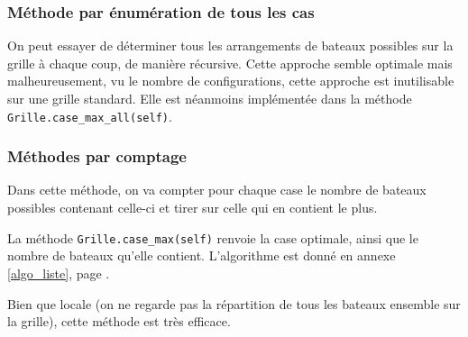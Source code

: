 \subsubsection{Méthode par énumération de tous les cas}

On peut essayer de déterminer tous les arrangements de bateaux possibles sur la grille à chaque coup, de manière récursive. Cette approche semble optimale mais malheureusement, vu le nombre de configurations, cette approche est inutilisable sur une grille standard. Elle est néanmoins implémentée dans la méthode \texttt{Grille.case\_max\_all(self)}.

\subsubsection{Méthodes par comptage}
Dans cette méthode, on va compter pour chaque case le nombre de bateaux possibles contenant celle-ci et tirer sur celle qui en contient le plus.

La méthode \texttt{Grille.case\_max(self)} renvoie la case optimale, ainsi que le nombre de bateaux qu'elle contient. L'algorithme est donné en annexe \ref{algo_liste}, page \pageref{case_max}.



Bien que locale (on ne regarde pas la répartition de tous les bateaux ensemble sur la grille), cette méthode est très efficace.




